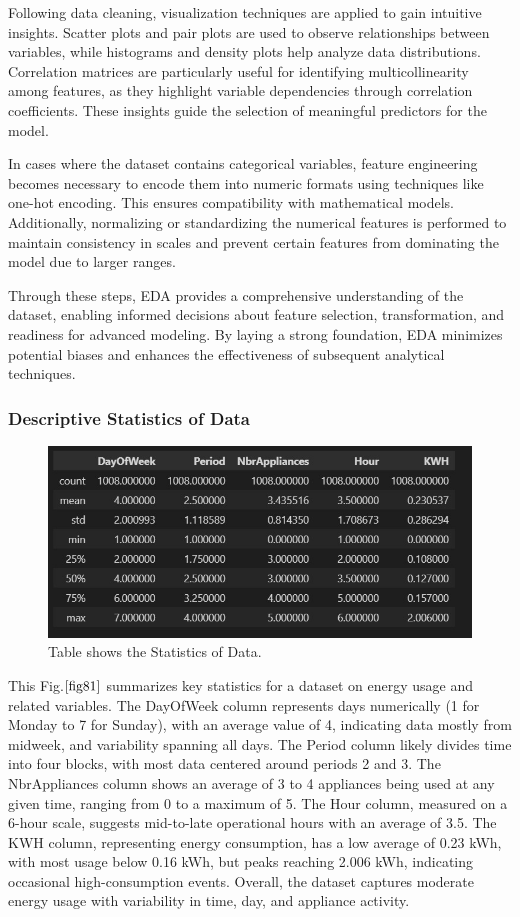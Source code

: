 \documentclass[english,12pt, titlepage]{article}
\begin{document}
	Following data cleaning, visualization techniques are applied to gain intuitive insights. Scatter plots and pair plots are used to observe relationships between variables, while histograms and density plots help analyze data distributions. Correlation matrices are particularly useful for identifying multicollinearity among features, as they highlight variable dependencies through correlation coefficients. These insights guide the selection of meaningful predictors for the model.
	
	In cases where the dataset contains categorical variables, feature engineering becomes necessary to encode them into numeric formats using techniques like one-hot encoding. This ensures compatibility with mathematical models. Additionally, normalizing or standardizing the numerical features is performed to maintain consistency in scales and prevent certain features from dominating the model due to larger ranges.
	
	Through these steps, EDA provides a comprehensive understanding of the dataset, enabling informed decisions about feature selection, transformation, and readiness for advanced modeling. By laying a strong foundation, EDA minimizes potential biases and enhances the effectiveness of subsequent analytical techniques.	
	
	\subsubsection{Descriptive Statistics of Data}

	\begin{figure}[!ht]
		\centering
		\includegraphics[width=0.6\linewidth]{fig7.jpeg}
		\caption{Table shows the Statistics of Data.}\label{fig81}
	\end{figure}
	
		This Fig.$\ref{fig81}$ summarizes key statistics for a dataset on energy usage and related variables. The DayOfWeek column represents days numerically (1 for Monday to 7 for Sunday), with an average value of 4, indicating data mostly from midweek, and variability spanning all days. The Period column likely divides time into four blocks, with most data centered around periods 2 and 3. The NbrAppliances column shows an average of 3 to 4 appliances being used at any given time, ranging from 0 to a maximum of 5. The Hour column, measured on a 6-hour scale, suggests mid-to-late operational hours with an average of 3.5. The KWH column, representing energy consumption, has a low average of 0.23 kWh, with most usage below 0.16 kWh, but peaks reaching 2.006 kWh, indicating occasional high-consumption events. Overall, the dataset captures moderate energy usage with variability in time, day, and appliance activity.
	
\end{document}
